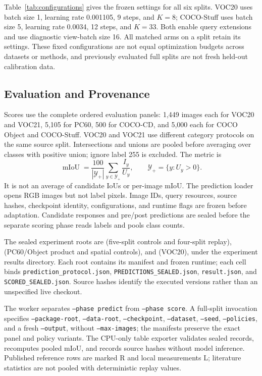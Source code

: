 

Table~\ref{tab:configurations} gives the frozen settings for all six splits. VOC20 uses batch size 1, learning rate 0.001105, 9 steps, and $K=8$; COCO-Stuff uses batch size 5, learning rate 0.0034, 12 steps, and $K=33$. Both enable query extensions and use diagnostic view-batch size 16. All matched arms on a split retain its settings. These fixed configurations are not equal optimization budgets across datasets or methods, and previously evaluated full splits are not fresh held-out calibration data.

\subsection{Evaluation and Provenance}
Scores use the complete ordered evaluation panels: 1,449 images each for VOC20 and VOC21, 5,105 for PC60, 500 for COCO-CD, and 5,000 each for COCO Object and COCO-Stuff. VOC20 and VOC21 use different category protocols on the same source split. Intersections and unions are pooled before averaging over classes with positive union; ignore label 255 is excluded. The metric is
\begin{equation}
\operatorname{mIoU}=\frac{100}{|\mathcal Y_+|}
\sum_{y\in\mathcal Y_+}\frac{I_y}{U_y},\qquad
\mathcal Y_+=\{y:U_y>0\}.
\end{equation}
It is not an average of candidate IoUs or per-image mIoU. The prediction loader opens RGB images but not label pixels. Image IDs, query resources, source hashes, checkpoint identity, configurations, and runtime flags are frozen before adaptation. Candidate responses and pre/post predictions are sealed before the separate scoring phase reads labels and pools class counts.

The sealed experiment roots are  (five-split controls and four-split replay),  (PC60/Object product and spatial controls), and  (VOC20), under the experiment results directory. Each root contains its manifest and frozen runtime; each cell binds \texttt{prediction\_protocol.json}, \texttt{PREDICTIONS\_SEALED.json}, \texttt{result.json}, and \texttt{SCORED\_SEALED.json}. Source hashes identify the executed versions rather than an unspecified live checkout.

The worker separates \texttt{--phase predict} from \texttt{--phase score}. A full-split invocation specifies \texttt{--package-root}, \texttt{--data-root}, \texttt{--checkpoint}, \texttt{--dataset}, \texttt{--seed}, \texttt{--policies}, and a fresh \texttt{--output}, without \texttt{--max-images}; the manifests preserve the exact panel and policy variants. The CPU-only table exporter validates sealed records, recomputes pooled mIoU, and records source hashes without model inference. Published reference rows are marked R and local measurements L; literature statistics are not pooled with deterministic replay values.

